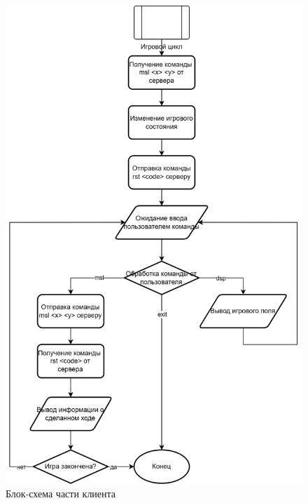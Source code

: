 \begin{figure}[H]
    \centering
    \includegraphics[width=0.85\linewidth]{images/lab3_flowchart_cont.drawio.png}
    \caption{Блок-схема части клиента}
    \label{fig:client_flowchart}
\end{figure}

